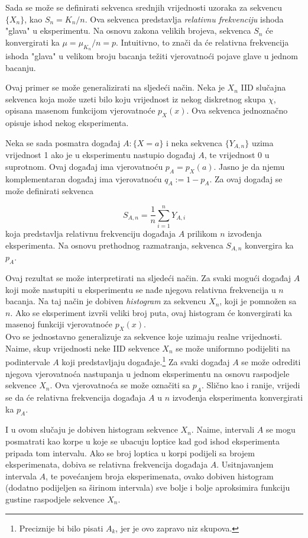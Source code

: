 Sada se može se definirati sekvenca srednjih vrijednosti uzoraka za sekvencu
$\{X_n\}$, kao $S_n = K_n / n$. Ova sekvenca predstavlja \textit{relativnu
frekvenciju} ishoda "glava" u eksperimentu. Na osnovu zakona velikih brojeva,
sekvenca $S_n$ će konvergirati ka $\mu = \mu_{K_n}/n = p$.  Intuitivno, to znači
da će relativna frekvencija ishoda "glava" u velikom broju bacanja težiti
vjerovatnoći pojave glave u jednom bacanju.

Ovaj primer se može generalizirati na sljedeći način. Neka je $X_n$ IID slučajna
sekvenca koja može uzeti bilo koju vrijednost iz nekog diskretnog skupa $\chi$,
opisana masenom funkcijom vjerovatnoće $p_{X}(x)$. Ova sekvenca jednoznačno
opisuje ishod nekog eksperimenta.

Neka se sada posmatra događaj $A:\{X=a\}$ i neka sekvenca $\{Y_{A,n}\}$ uzima
vrijednost 1 ako je u eksperimentu nastupio događaj $A$, te vrijednost 0 u
suprotnom. Ovaj događaj ima vjerovatnoću $p_A=p_X(a)$. Jasno je da njemu
komplementaran događaj ima vjerovatnoću $q_A:=1-p_A$. Za ovaj događaj se može
definirati sekvenca

\begin{equation}
    S_{A,n} = \frac{1}{n}\sum_{i=1}^{n} Y_{A,i}
\end{equation}
%
koja predstavlja relativnu frekvenciju događaja $A$ prilikom $n$ izvođenja
eksperimenta. Na osnovu prethodnog razmatranja, sekvenca $S_{A,n}$ konvergira ka
$p_A$.

Ovaj rezultat se može interpretirati na sljedeći način. Za svaki mogući događaj
$A$ koji može nastupiti u eksperimentu se nađe njegova relativna frekvencija u
$n$ bacanja. Na taj način je dobiven \textit{histogram} za sekvencu $X_n$, koji
je pomnožen sa $n$. Ako se eksperiment izvrši veliki broj puta, ovaj histogram
će konvergirati ka masenoj funkciji vjerovatnoće $p_X(x)$. \\

Ovo se jednostavno generalizuje za sekvence koje uzimaju realne vrijednosti.
Naime, skup vrijednosti neke IID sekvence $X_n$ se može uniformno podijeliti na
podintervale $A$ koji predstavljaju događaje.\footnote{Preciznije bi bilo pisati
$A_k$, jer je ovo zapravo niz skupova.} Za svaki događaj $A$ se može odrediti
njegova vjerovatnoća nastupanja u jednom eksperimentu na osnovu raspodjele
sekvence $X_n$. Ova vjerovatnoća se može označiti sa $p_A$. Slično kao i ranije,
vrijedi se da će relativna frekvencija događaja $A$ u $n$ izvođenja eksperimenta
konvergirati ka $p_A$.

I u ovom slučaju je dobiven histogram sekvence $X_n$. Naime, intervali $A$ se
mogu posmatrati kao korpe u koje se ubacuju loptice kad god ishod eksperimenta
pripada tom intervalu. Ako se broj loptica u korpi podijeli sa brojem
eksperimenata, dobiva se relativna frekvencija događaja $A$. Usitnjavanjem
intervala $A$, te povećanjem broja eksperimenata, ovako dobiven histogram
(dodatno podijeljen sa širinom intervala) sve bolje i bolje aproksimira funkciju
gustine raspodjele sekvence $X_n$.

